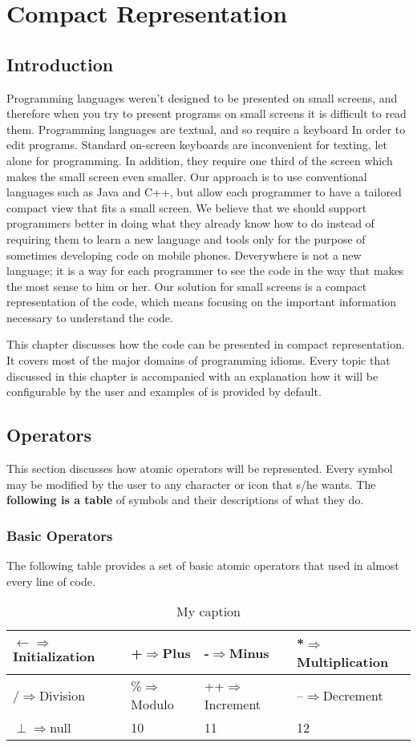 \chapter{Compact Representation}
\section{Introduction}
Programming languages weren't designed to be presented on small screens, and therefore when you try to present programs on small screens it is difficult to read them. Programming languages are textual, and so require a keyboard In order to edit programs. Standard on-screen keyboards are inconvenient for texting, let alone for programming. In addition, they require one third of the screen which makes the small screen even smaller. Our approach is to use conventional languages such as Java and C++, but allow each programmer to have a tailored compact view that fits a small screen. We believe that we should support programmers better in doing what they already know how to do instead of requiring them to learn a new language and tools only for the purpose of sometimes developing code on mobile phones. Deverywhere is not a new language; it is a way for each programmer to see the code in the way that makes the most sense to him or her. Our solution for small screens is a compact representation of the code, which means focusing on the important information necessary to understand the code. 

This chapter discusses how the code can be presented in compact representation. It covers most of the major domains of programming idioms. Every topic that discussed in this chapter is accompanied with an explanation how it will be configurable by the user and examples of is provided by default.
\section{Operators}
This section discusses how atomic operators will be represented. Every symbol may be modified by the user to any character or icon that s/he wants. The \textbf{following is a table} of symbols and their descriptions of what they do.
\subsection{Basic Operators}
The following table provides a set of basic atomic operators that used in almost every line of code.
\begin{table}[]
\centering
\label{my-label}
\begin{tabular}{|l|l|l|l|}
\hline
$ \longleftarrow $$ \Rightarrow $Initialization & +$ \Rightarrow $Plus & -$ \Rightarrow $Minus  & *$ \Rightarrow $Multiplication  \\ \hline
/$ \Rightarrow $Division & \%$ \Rightarrow $Modulo  & ++$ \Rightarrow $Increment  & --$ \Rightarrow $Decrement  \\ \hline
$ \perp $$ \Rightarrow $null & 10 & 11 & 12 \\ \hline
\end{tabular}
\caption{My caption}
\end{table}
